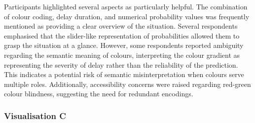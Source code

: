 \documentclass[final,journal,a4paper]{IEEEtran}
\begin{document}
Participants highlighted several aspects as particularly helpful. The combination of colour coding, delay duration, and numerical probability values was frequently mentioned as providing a clear overview of the situation. Several respondents emphasised that the slider-like representation of probabilities allowed them to grasp the situation at a glance. However, some respondents reported ambiguity regarding the semantic meaning of colours, interpreting the colour gradient as representing the severity of delay rather than the reliability of the prediction. This indicates a potential risk of semantic misinterpretation when colours serve multiple roles. Additionally, accessibility concerns were raised regarding red-green colour blindness, suggesting the need for redundant encodings.

\subsubsection{Visualisation C}
\end{document}
